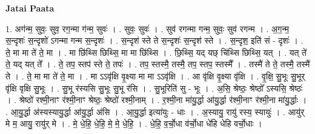 \documentclass[17pt]{extarticle}
\begin{document}
\textbf{Jatai Paata} \newline

1. अग॑न्म॒ सुवः॒ सुव॒ रग॒न्मा ग॑न्म॒ सुवः॑ । . सुवः॒ सुवः॑ । . सुव॑ रगन्मा गन्म॒ सुवः॒ सुव॑ रगन्म । . अ॒ग॒न्म॒ स॒न्दृशः॑ स॒न्दृशो॑ ऽगन्मा गन्म स॒न्दृशः॑ । . स॒न्दृश॑ स्ते ते स॒न्दृशः॑ स॒न्दृश॑ स्ते । . स॒न्दृश॒ इति॑ सं - दृशः॑ । . ते॒ मा मा ते॑ ते॒ मा । . मा छि॑थ्सि छिथ्सि॒ मा मा छि॑थ्सि । . छि॒थ्सि॒ यद् यछ् चि॑थ्सि छिथ्सि॒ यत् । . यत् ते॑ ते॒ यद् यत् ते᳚ । . ते॒ तप॒ स्तप॑ स्ते ते॒ तपः॑ । . तप॒ स्तस्मै॒ तस्मै॒ तप॒ स्तप॒ स्तस्मै᳚ । . तस्मै॑ ते ते॒ तस्मै॒ तस्मै॑ ते । . ते॒ मा मा ते॑ ते॒ मा । . मा ऽऽवृ॑क्षि वृ॒क्ष्या मा मा ऽऽवृ॑क्षि । . आ वृ॑क्षि वृ॒क्ष्या वृ॑क्षि । . वृ॒क्षि॒ सु॒भूः सु॒भूर् वृ॑क्षि वृक्षि सु॒भूः । . सु॒भू र॑स्यसि सु॒भूः सु॒भू र॑सि । . सु॒भूरिति॑ सु - भूः । . अ॒सि॒ श्रेष्ठः॒ श्रेष्ठो᳚ ऽस्यसि॒ श्रेष्ठः॑ । . श्रेष्ठो॑ रश्मी॒नाꣳ र॑श्मी॒नाꣳ श्रेष्ठः॒ श्रेष्ठो॑ रश्मी॒नाम् । . र॒श्मी॒ना मा॑यु॒र्द्धा आ॑यु॒र्द्धा र॑श्मी॒नाꣳ र॑श्मी॒ना मा॑यु॒र्द्धाः । . आ॒यु॒र्द्धा अ॑स्यस्यायु॒र्द्धा आ॑यु॒र्द्धा अ॑सि । . आ॒यु॒र्द्धा इत्या॑युः - धाः । . अ॒स्यायु॒ रायु॑ रस्य॒ स्यायुः॑ । . आयु॑र् मे म॒ आयु॒ रायु॑र् मे । . मे॒ धे॒हि॒ धे॒हि॒ मे॒ मे॒ धे॒हि॒ । . धे॒हि॒ व॒र्चो॒धा व॑र्चो॒धा धे॑हि धेहि वर्चो॒धाः । \newline
\end{document}
